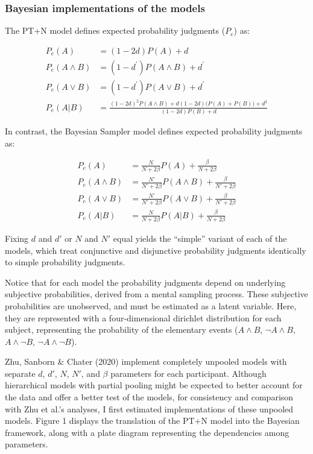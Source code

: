 \documentclass[
  man,floatsintext]{apa6}
\begin{document}
\hypertarget{bayesian-implementations-of-the-models}{%
\subsubsection{Bayesian implementations of the models}\label{bayesian-implementations-of-the-models}}

The PT+N model defines expected probability judgments (\(P_e\)) as:

\begin{align*}
  P_{e}(A) &= (1-2d)P(A) + d \\
  P_e(A\land B) &= (1-d^\prime)P(A \land B)+d^\prime \\
  P_e(A\lor B) &= (1-d^\prime)P(A \lor B)+d^\prime \\
  P_e(A|B) &= \frac{(1-2d)^2P(A \land B) + d(1-2d)\big(P(A)+P(B)\big)+d^2}{(1-2d)P(B)+d}
\end{align*}

In contrast, the Bayesian Sampler model defines expected probability judgments as:

\begin{align*}
  P_{e}(A) &= \frac{N}{N + 2 \beta}P(A) + \frac{\beta}{N+2 \beta} \\
  P_{e}(A \land B) &= \frac{N’}{N’ + 2 \beta}P(A \land B) + \frac{\beta}{N’+2 \beta} \\
  P_{e}(A \lor B) &= \frac{N’}{N’ + 2 \beta}P(A \lor B) + \frac{\beta}{N’+2 \beta} \\
  P_{e}(A|B) &= \frac{N}{N + 2 \beta}P(A|B) + \frac{\beta}{N+2 \beta}
\end{align*}

Fixing \(d\) and \(d'\) or \(N\) and \(N'\) equal yields the ``simple'' variant of each of the models, which treat conjunctive and disjunctive probability judgments identically to simple probability judgments.

Notice that for each model the probability judgments depend on underlying subjective probabilities, derived from a mental sampling process. These subjective probabilities are unobserved, and must be estimated as a latent variable. Here, they are represented with a four-dimensional dirichlet distribution for each subject, representing the probability of the elementary events (\(A \land B\), \(\neg A \land B\), \(A \land \neg B\), \(\neg A \land \neg B\)).

Zhu, Sanborn \& Chater (2020) implement completely unpooled models with separate \(d\), \(d'\), \(N\), \(N'\), and \(\beta\) parameters for each participant. Although hierarchical models with partial pooling might be expected to better account for the data and offer a better test of the models, for consistency and comparison with Zhu et al.'s \autocite*{zhu.etal2020} analyses, I first estimated implementations of these unpooled models. Figure 1 displays the translation of the PT+N model into the Bayesian framework, along with a plate diagram representing the dependencies among parameters.
\end{document}
